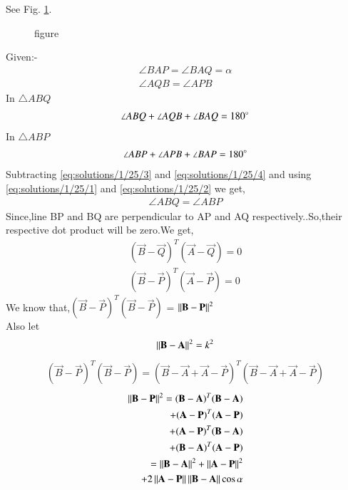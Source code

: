 See Fig. \ref{eq:solutions/1/25/fig1}.

\begin{figure}[!ht]
\centering
\resizebox{\columnwidth}{!}{}
\caption{figure}
\label{eq:solutions/1/25/fig1}
\end{figure}

Given:-
\begin{align}
  \angle{BAP}=\angle{BAQ}=\alpha\label{eq:solutions/1/25/1}\\ 
    \angle{AQB}=\angle{APB}\label{eq:solutions/1/25/2}
\end{align}
In $\triangle ABQ$
\begin{align}
    \angle{ABQ} + \angle{AQB} + \angle{BAQ}=180\degree\label{eq:solutions/1/25/3}
\end{align}
In $\triangle ABP$
\begin{align}
    \angle{ABP} + \angle{APB} + \angle{BAP}=180\degree\label{eq:solutions/1/25/4}
\end{align}
Subtracting \eqref{eq:solutions/1/25/3} and \eqref{eq:solutions/1/25/4} and using \eqref{eq:solutions/1/25/1} and \eqref{eq:solutions/1/25/2} we get,
\begin{align}
\angle{ABQ}=\angle{ABP}
\end{align}
Since,line BP and BQ are perpendicular to AP and AQ respectively..So,their respective dot product will be zero.We get,
\begin{align}
    (\vec{B}-\vec{Q})^T(\vec{A}-\vec{Q})=0\label{eq:solutions/1/25/5}\\
    (\vec{B}-\vec{P})^T(\vec{A}-\vec{P})=0\label{eq:solutions/1/25/6}
\end{align}
We know that,$(\vec{B}-\vec{P})^T(\vec{B}-\vec{P})$ = $\left\lVert\mathbf{B}-\mathbf{P}\right\rVert^2$\\
 Also let
 \begin{align}
 \left\lVert\mathbf{B}-\mathbf{A}\right\rVert^2 = k^2\label{eq:solutions/1/25/7}
 \end{align}
\begin{align}
(\vec{B}-\vec{P})^T(\vec{B}-\vec{P})=(\vec{B}-\vec{A}+\vec{A}-\vec{P})^T(\vec{B}-\vec{A}+\vec{A}-\vec{P})
\end{align}
\begin{align}
 \begin{split}
\left\lVert\mathbf{B}-\mathbf{P}\right\rVert^2=(\mathbf{B}-\mathbf{A})^T(\mathbf{B}-\mathbf{A})\\
+(\mathbf{A}-\mathbf{P})^T(\mathbf{A}-\mathbf{P})\\
+(\mathbf{A}-\mathbf{P})^T(\mathbf{B}-\mathbf{A})\\
+(\mathbf{B}-\mathbf{A})^T(\mathbf{A}-\mathbf{P})\\
=\left\lVert\mathbf{B}-\mathbf{A}\right\rVert^2 + \left\lVert\mathbf{A}-\mathbf{P}\right\rVert^2\\ 
  + 2\left\lVert\mathbf{A}-\mathbf{P}\right\rVert\left\lVert\mathbf{B}-\mathbf{A}\right\rVert\cos\alpha\label{eq:solutions/1/25/8}
  \end{split}
\end{align}
